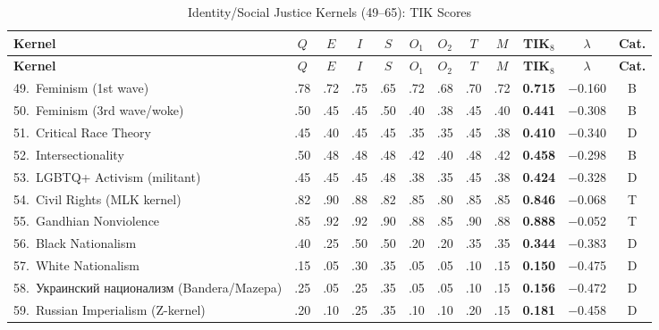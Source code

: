 \documentclass[11pt,a4paper]{article}
\theoremstyle{definition}
\theoremstyle{remark}
\begin{document}
\begin{longtable}{@{}l|cccccccc|cc|c@{}}
\caption{Identity/Social Justice Kernels (49--65): TIK Scores}
\label{tab:identity}\\
\toprule
\textbf{Kernel} &
$Q$ & $E$ & $I$ & $S$ & $O_1$ & $O_2$ & $T$ & $M$ &
\textbf{TIK$_8$} & $\lambda$ & \textbf{Cat.} \\
\midrule
\endfirsthead
\toprule
\textbf{Kernel} &
$Q$ & $E$ & $I$ & $S$ & $O_1$ & $O_2$ & $T$ & $M$ &
\textbf{TIK$_8$} & $\lambda$ & \textbf{Cat.} \\
\midrule
\endhead
\bottomrule
\endlastfoot

49.\ Feminism (1st wave)
  & .78 & .72 & .75 & .65 & .72 & .68 & .70 & .72
  & \textbf{0.715} & $-$0.160 & \textcolor{borderline}{B} \\
50.\ Feminism (3rd wave/woke)
  & .50 & .45 & .45 & .50 & .40 & .38 & .45 & .40
  & \textbf{0.441} & $-$0.308 & \textcolor{borderline}{B} \\
51.\ Critical Race Theory
  & .45 & .40 & .45 & .45 & .35 & .35 & .45 & .38
  & \textbf{0.410} & $-$0.340 & \textcolor{collapse}{D} \\
52.\ Intersectionality
  & .50 & .48 & .48 & .48 & .42 & .40 & .48 & .42
  & \textbf{0.458} & $-$0.298 & \textcolor{borderline}{B} \\
53.\ LGBTQ+ Activism (militant)
  & .45 & .45 & .45 & .48 & .38 & .35 & .45 & .38
  & \textbf{0.424} & $-$0.328 & \textcolor{collapse}{D} \\
54.\ Civil Rights (MLK kernel)
  & .82 & .90 & .88 & .82 & .85 & .80 & .85 & .85
  & \textbf{0.846} & $-$0.068 & \textcolor{survival}{T} \\
55.\ Gandhian Nonviolence
  & .85 & .92 & .92 & .90 & .88 & .85 & .90 & .88
  & \textbf{0.888} & $-$0.052 & \textcolor{survival}{T} \\
56.\ Black Nationalism
  & .40 & .25 & .50 & .50 & .20 & .20 & .35 & .35
  & \textbf{0.344} & $-$0.383 & \textcolor{collapse}{D} \\
57.\ White Nationalism
  & .15 & .05 & .30 & .35 & .05 & .05 & .10 & .15
  & \textbf{0.150} & $-$0.475 & \textcolor{collapse}{D} \\
58.\ \foreignlanguage{russian}{Украинский национализм} (Bandera/Mazepa)
  & .25 & .05 & .25 & .35 & .05 & .05 & .10 & .15
  & \textbf{0.156} & $-$0.472 & \textcolor{collapse}{D} \\
59.\ Russian Imperialism (Z-kernel)
  & .20 & .10 & .25 & .35 & .10 & .10 & .20 & .15
  & \textbf{0.181} & $-$0.458 & \textcolor{collapse}{D} \\

\end{longtable}
\end{document}
